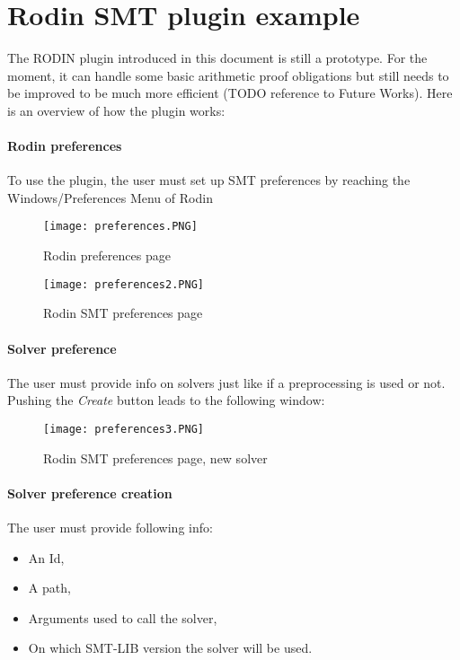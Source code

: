 \section{Rodin SMT plugin example}
The RODIN plugin introduced in this document is still a prototype. For the moment, it can handle some basic arithmetic proof obligations but still needs to be improved to be much more efficient (TODO reference to Future Works). 
Here is an overview of how the plugin works:

\paragraph{Rodin preferences}
To use the plugin, the user must set up SMT preferences by reaching the Windows/Preferences Menu of Rodin
\begin{figure}
\centering
\texttt{[image: preferences.PNG]}
\caption{Rodin preferences page} 
\label{Fig: Rodin Preferences}
\end{figure}

\begin{figure}
\centering
\texttt{[image: preferences2.PNG]}
\caption{Rodin SMT preferences page} 
\label{Fig: Rodin SMT Preferences}
\end{figure}

\paragraph{Solver preference}
The user must provide info on solvers just like if a preprocessing is used or not. Pushing the \textit{Create} button leads to the following window:

\begin{figure}
\centering
\texttt{[image: preferences3.PNG]}
\caption{Rodin SMT preferences page, new solver} 
\label{Fig: New solver in SMT preferences}
\end{figure}

\paragraph{Solver preference creation}
The user must provide following info:

\begin{itemize}
\item An Id,
\item A path,
\item Arguments used to call the solver,
\item On which SMT-LIB version the solver will be used.   
\end{itemize}

